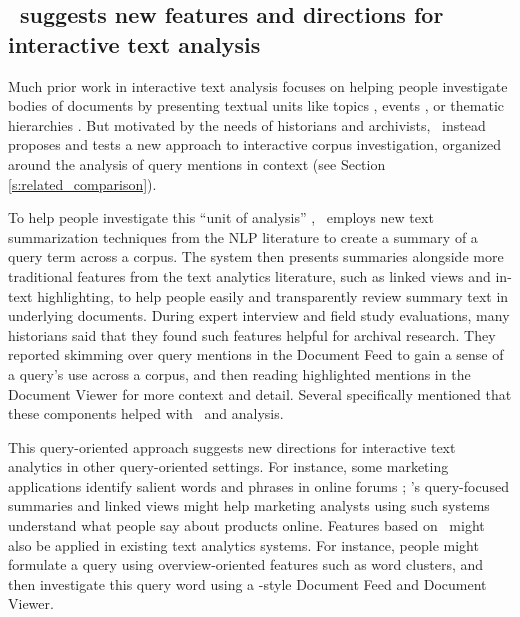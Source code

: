 

\subsection{\ours~suggests new features and directions for interactive text analysis}\label{s:discussion_simplification}

Much prior work in interactive text analysis focuses on helping people investigate bodies of documents by presenting textual units like topics \cite{tiara}, events \cite{eventriver}, or thematic hierarchies \cite{overview}.
But motivated by the needs of historians and archivists, \ours~instead proposes and tests a new approach to interactive corpus investigation, organized around the analysis of query mentions in context (see Section \ref{s:related_comparison}).

To help people investigate this ``unit of analysis'' \cite{chuangheer}, \ours~employs new text summarization techniques from the NLP literature to create a summary of a query term across a corpus.
The system then presents summaries alongside more traditional features from the text analytics literature, such as linked views and in-text highlighting, to help people easily and transparently review summary text in underlying documents.
During expert interview and field study evaluations, many historians said that they found such features helpful for archival research. 
They reported skimming over query mentions in the Document Feed to gain a sense of a query's use across a corpus, and then reading highlighted mentions in the Document Viewer for more context and detail. 
Several specifically mentioned that these components helped with \burdensome~and analysis.

This query-oriented approach suggests new directions for interactive text analytics in other query-oriented settings.
For instance, some marketing applications identify salient words and phrases in online forums \cite[Section 4.1]{marketingkdd};
\ours's query-focused summaries and linked views might help marketing analysts using such systems understand what people say about products online.
Features based on \ours~might also be applied in existing text analytics systems.
For instance, people might formulate a query using overview-oriented features such as word clusters, 
and then investigate this query word using a \ours-style Document Feed and Document Viewer.

